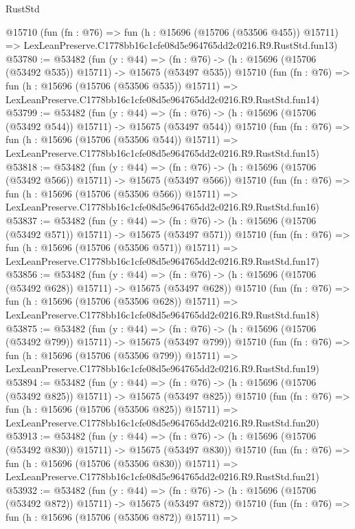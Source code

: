 \begin{lexlean}{RustStd}
\begin{coremodule}
    @15710
    (fun (fn : @76) =>
    fun (h : @15696 (@15706 (@53506 @455)) @15711) =>
    LexLeanPreserve.C1778bb16c1cfe08d5e964765dd2c0216.R9.RustStd.fun13)
@53780 := @53482
    (fun (y : @44) =>
    (fn : @76) -> (h : @15696 (@15706 (@53492 @535)) @15711) -> @15675 (@53497 @535))
    @15710
    (fun (fn : @76) =>
    fun (h : @15696 (@15706 (@53506 @535)) @15711) =>
    LexLeanPreserve.C1778bb16c1cfe08d5e964765dd2c0216.R9.RustStd.fun14)
@53799 := @53482
    (fun (y : @44) =>
    (fn : @76) -> (h : @15696 (@15706 (@53492 @544)) @15711) -> @15675 (@53497 @544))
    @15710
    (fun (fn : @76) =>
    fun (h : @15696 (@15706 (@53506 @544)) @15711) =>
    LexLeanPreserve.C1778bb16c1cfe08d5e964765dd2c0216.R9.RustStd.fun15)
@53818 := @53482
    (fun (y : @44) =>
    (fn : @76) -> (h : @15696 (@15706 (@53492 @566)) @15711) -> @15675 (@53497 @566))
    @15710
    (fun (fn : @76) =>
    fun (h : @15696 (@15706 (@53506 @566)) @15711) =>
    LexLeanPreserve.C1778bb16c1cfe08d5e964765dd2c0216.R9.RustStd.fun16)
@53837 := @53482
    (fun (y : @44) =>
    (fn : @76) -> (h : @15696 (@15706 (@53492 @571)) @15711) -> @15675 (@53497 @571))
    @15710
    (fun (fn : @76) =>
    fun (h : @15696 (@15706 (@53506 @571)) @15711) =>
    LexLeanPreserve.C1778bb16c1cfe08d5e964765dd2c0216.R9.RustStd.fun17)
@53856 := @53482
    (fun (y : @44) =>
    (fn : @76) -> (h : @15696 (@15706 (@53492 @628)) @15711) -> @15675 (@53497 @628))
    @15710
    (fun (fn : @76) =>
    fun (h : @15696 (@15706 (@53506 @628)) @15711) =>
    LexLeanPreserve.C1778bb16c1cfe08d5e964765dd2c0216.R9.RustStd.fun18)
@53875 := @53482
    (fun (y : @44) =>
    (fn : @76) -> (h : @15696 (@15706 (@53492 @799)) @15711) -> @15675 (@53497 @799))
    @15710
    (fun (fn : @76) =>
    fun (h : @15696 (@15706 (@53506 @799)) @15711) =>
    LexLeanPreserve.C1778bb16c1cfe08d5e964765dd2c0216.R9.RustStd.fun19)
@53894 := @53482
    (fun (y : @44) =>
    (fn : @76) -> (h : @15696 (@15706 (@53492 @825)) @15711) -> @15675 (@53497 @825))
    @15710
    (fun (fn : @76) =>
    fun (h : @15696 (@15706 (@53506 @825)) @15711) =>
    LexLeanPreserve.C1778bb16c1cfe08d5e964765dd2c0216.R9.RustStd.fun20)
@53913 := @53482
    (fun (y : @44) =>
    (fn : @76) -> (h : @15696 (@15706 (@53492 @830)) @15711) -> @15675 (@53497 @830))
    @15710
    (fun (fn : @76) =>
    fun (h : @15696 (@15706 (@53506 @830)) @15711) =>
    LexLeanPreserve.C1778bb16c1cfe08d5e964765dd2c0216.R9.RustStd.fun21)
@53932 := @53482
    (fun (y : @44) =>
    (fn : @76) -> (h : @15696 (@15706 (@53492 @872)) @15711) -> @15675 (@53497 @872))
    @15710
    (fun (fn : @76) =>
    fun (h : @15696 (@15706 (@53506 @872)) @15711) =>

\end{coremodule}
\end{lexlean}
